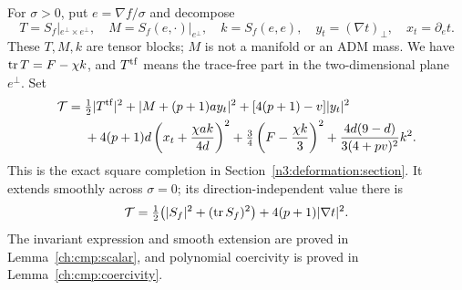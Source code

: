 For $\sigma>0$, put $e=\nabla f/\sigma$ and decompose
\[
 T=S_f|_{e^\perp\times e^\perp},\quad
 M=S_f(e,\cdot)|_{e^\perp},\quad k=S_f(e,e),\quad
 y_t=(\nabla t)_\perp,\quad x_t=\partial_et.
\]
These $T,M,k$ are tensor blocks; $M$ is not a manifold or an ADM
mass.  We have $\operatorname{tr} T=F-\chi k$, and $T^{\rm tf}$ means the
trace-free part in the two-dimensional plane $e^\perp$.  Set
\begin{equation}\label{ch:ell:quadratic}
 \begin{split}
 \mathcal T={}&\tfrac12|T^{\rm tf}|^2
       +|M+(p+1)ay_t|^2+[4(p+1)-v]|y_t|^2\\
 &+4(p+1)d\left(x_t+\frac{\chi ak}{4d}\right)^2
       +\tfrac34\left(F-\frac{\chi k}{3}\right)^2
       +\frac{4d(9-d)}{3(4+pv)^2}k^2.
 \end{split}
\end{equation}
This is the exact square completion in Section~\ref{n3:deformation:section}.
It extends smoothly across $\sigma=0$; its direction-independent
value there is
\[
 \mathcal T=\tfrac12\bigl(|S_f|^2+(\operatorname{tr} S_f)^2\bigr)
                  +4(p+1)|\nabla t|^2.
\]
The invariant expression and smooth extension are proved in
Lemma~\ref{ch:cmp:scalar}, and polynomial coercivity is proved in
Lemma~\ref{ch:cmp:coercivity}.

